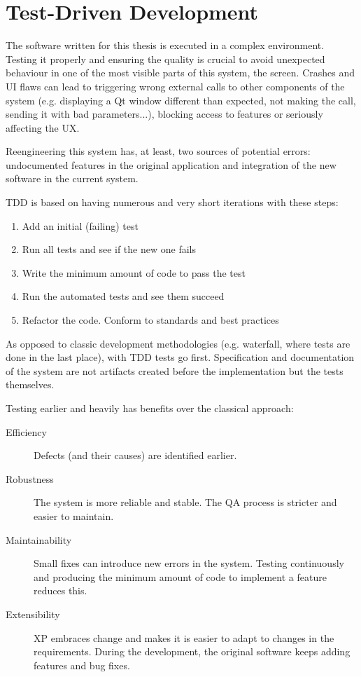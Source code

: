 \section{Test-Driven Development}
\label{sec:testdrivendev}
The software written for this thesis is executed in a complex environment.
Testing it properly and ensuring the quality is crucial to avoid unexpected behaviour in one of the most visible parts of this system, the screen.
Crashes and \ac{UI} flaws can lead to triggering wrong external calls to other components of the system (e.g. displaying a Qt window different than expected, not making the call, sending it with bad parameters...), blocking access to features or seriously affecting the \ac{UX}.

Reengineering this system has, at least, two sources of potential errors: 
undocumented features in the original application and integration of the new software in the current system.

\ac{TDD} is based on having numerous and very short iterations with these steps:
\begin{enumerate}
    \item Add an initial (failing) test
    \item Run all tests and see if the new one fails
    \item Write the minimum amount of code to pass the test
    \item Run the automated tests and see them succeed
    \item Refactor the code. Conform to standards and best practices
\end{enumerate}

As opposed to classic development methodologies (e.g. waterfall, where tests are done in the last place), with \ac{TDD} tests go first. 
Specification and documentation of the system are not artifacts created before the implementation but the tests themselves.

Testing earlier and heavily has benefits over the classical approach:
\begin{description}
\item[Efficiency] Defects (and their causes) are identified earlier.
\item[Robustness] The system is more reliable and stable. 
The \ac{QA} process is stricter and easier to maintain.
\item[Maintainability] Small fixes can introduce new errors in the system. 
Testing continuously and producing the minimum amount of code to implement a feature reduces this.
\item[Extensibility] \ac{XP} embraces change and makes it is easier to adapt to changes in the requirements. 
During the development, the original software keeps adding features and bug fixes.
\end{description}

